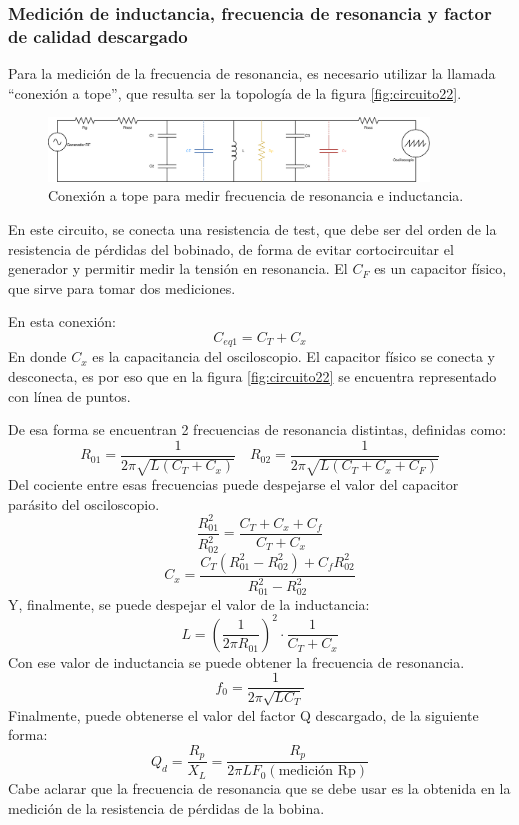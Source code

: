\documentclass{article}
\begin{document}
\subsubsection{Medición de inductancia, frecuencia de resonancia y factor de calidad descargado}
Para la medición de la frecuencia de resonancia, es necesario utilizar la llamada “conexión a tope”, que resulta ser la topología de la figura \ref{fig:circuito22}.
\begin{figure}[H]
\centering
\includegraphics[width=0.9\textwidth]{./img/figura24.eps}
\caption{Conexión a tope para medir frecuencia de resonancia e inductancia.}
\label{fig:circuito24}
\end{figure}
\noindent En este circuito, se conecta una resistencia de test, que debe ser del orden de la resistencia de pérdidas del bobinado, de forma de evitar cortocircuitar el generador y permitir medir la tensión en resonancia. El $C_F$ es un capacitor físico, que sirve para tomar dos mediciones. 

En esta conexión:
\begin{equation*}
    C_{eq1} = C_T + C_x
\end{equation*}
En donde $C_x$ es la capacitancia del osciloscopio. El capacitor físico se conecta y desconecta, es por eso que en la figura \ref{fig:circuito22} se encuentra representado con línea de puntos. 

\noindent De esa forma se encuentran 2 frecuencias de resonancia distintas, definidas como:
\begin{equation*}
    R_{01} = \frac{1}{2\pi \sqrt{L(C_T+C_x)}} \quad R_{02} = \frac{1}{2\pi \sqrt{L(C_T+C_x+C_F)}}
\end{equation*}
\noindent Del cociente entre esas frecuencias puede despejarse el valor del capacitor parásito del osciloscopio.
\begin{equation*}
    \frac{R_{01}^2}{R_{02}^2} = \frac{C_T + C_x + C_f }{C_T + C_x}
\end{equation*}
\begin{equation*}
    C_x = \frac{C_T (R_{01}^2-R_{02}^2)+C_f R_{02}^2}{R_{01}^2-R_{02}^2}
\end{equation*}
\noindent Y, finalmente, se puede despejar el valor de la inductancia:
\begin{equation*}
    L = \left( \frac{1}{2\pi R_{01}}\right)^2 \cdot \frac{1}{C_T + C_x}
\end{equation*}
\noindent Con ese valor de inductancia se puede obtener la frecuencia de resonancia.
\begin{equation*}
    f_0 = \frac{1}{2\pi \sqrt{LC_T}}
\end{equation*}
\noindent Finalmente, puede obtenerse el valor del factor Q descargado, de la siguiente forma:
\begin{equation*}
    Q_d = \frac{R_p}{X_L} = \frac{R_p}{2\pi LF_0 (\text{medición Rp})}
\end{equation*}
\noindent Cabe aclarar que la frecuencia de resonancia que se debe usar es la obtenida en la medición de la resistencia de pérdidas de la bobina.
\end{document}
